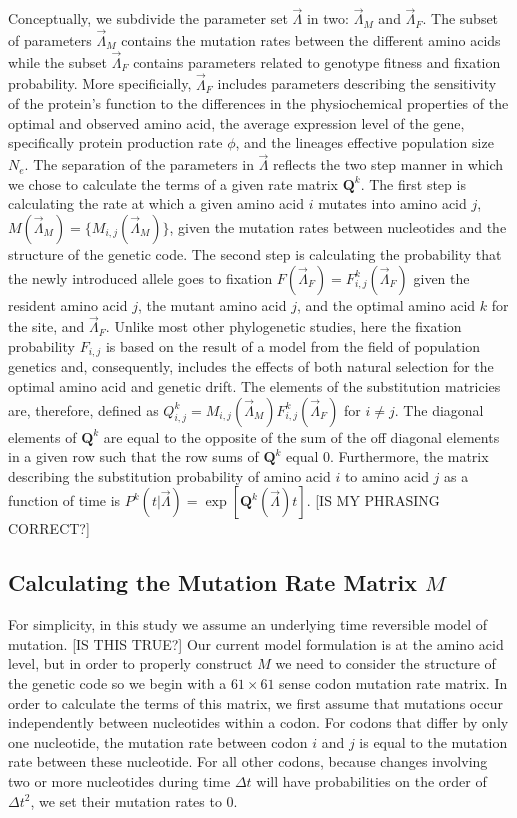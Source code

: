 \documentclass[13pt]{article}
\newcommand{\Qmat}{\ensuremath{\mathbf{Q}}\xspace}
\begin{document}
Conceptually, we subdivide the parameter set $\vec{\Lambda}$ in two:  $\vec{\Lambda}_M$ and $\vec{\Lambda}_F$.
The subset of parameters  $\vec{\Lambda}_M$ contains the mutation rates between the different amino acids while the subset $\vec{\Lambda}_F$ contains parameters related to genotype fitness and fixation probability.
More specificially, $\vec{\Lambda}_F$ includes parameters describing the sensitivity of the protein's function to the differences in the physiochemical properties of the optimal and observed amino acid, the average expression level of the gene, specifically protein production rate $\phi$, and the lineages effective population size $N_e$.
The separation of the parameters in $\vec{\Lambda}$ reflects the two step manner in which we chose to calculate the terms of a given rate matrix $\Qmat^k$.
The first step is calculating the rate at which a given amino acid $i$ mutates into amino acid $j$, $M(\vec{\Lambda}_M) = \{M_{i,j}(\vec{\Lambda}_M)\}$, given the mutation rates between nucleotides and the structure of the genetic code.
The second step is calculating the probability that the newly introduced allele goes to fixation   $F(\vec{\Lambda}_F) = F^k_{i,j}(\vec{\Lambda}_F)$ given the resident amino acid $j$, the mutant amino acid $j$, and the optimal amino acid $k$ for the site, and $\vec{\Lambda}_F$.
Unlike most other phylogenetic studies, here the fixation probability $F_{i,j}$ is based on the result of a model from the field of population genetics and, consequently, includes the effects of both natural selection for the optimal amino acid and genetic drift.
The elements of the substitution matricies are, therefore, defined as  $Q^k_{i,j} = M_{i,j}(\vec{\Lambda}_M) F^k_{i,j}(\vec{\Lambda}_F)$ for $i \neq j$.
The diagonal elements of $\Qmat^k$ are equal to the opposite of the sum of the off diagonal elements in a given row such that the row sums of $\Qmat^k$ equal 0.
Furthermore, the matrix describing the substitution probability of amino acid $i$ to amino acid $j$ as a function of time is $P^k(t|\vec{\Lambda}) = \exp\left[\Qmat^k(\vec{\Lambda}) t\right]$. [IS MY PHRASING CORRECT?] %


\subsection*{Calculating the Mutation Rate Matrix $M$}
For simplicity, in this study we assume an underlying time reversible model of mutation. [IS THIS TRUE?]
Our current model formulation is at the amino acid level, but in order to properly construct $M$ we need to consider the structure of the genetic code so we begin with a $61 \times 61$ sense codon mutation rate matrix.
In order to calculate the terms of this matrix, we first assume that mutations occur independently between nucleotides within a codon.
For codons that differ by only one nucleotide, the mutation rate between codon $i$ and $j$ is equal to the mutation rate between these nucleotide.
For all other codons, because changes involving two or more nucleotides during time $\Delta t$ will have probabilities on the order of $\Delta t^2$, we set their mutation rates to 0.
\end{document}
